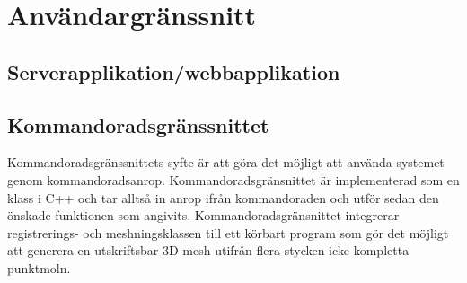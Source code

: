\documentclass[a4paper,titlepage,12pt]{article}
\begin{document}
\newpage
 
\section{Användargränssnitt}
	\subsection{Serverapplikation/webbapplikation}
	
	\subsection{Kommandoradsgränssnittet}
		Kommandoradsgränssnittets syfte är att göra det möjligt att använda systemet genom kommandoradsanrop. Kommandoradsgränsnittet är implementerad som en klass i C++ och tar alltså in anrop ifrån kommandoraden och utför sedan den önskade funktionen som angivits. Kommandoradsgränsnittet integrerar registrerings- och meshningsklassen till ett körbart program som gör det möjligt att generera en utskriftsbar 3D-mesh utifrån flera stycken icke kompletta punktmoln.
	
\newpage
\end{document}
